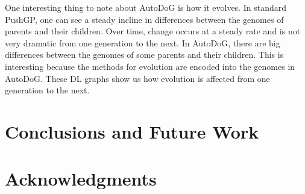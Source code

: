 \documentclass{sig-alternate}
\begin{document}
One interesting thing to note about AutoDoG is how it evolves. In standard PushGP, one can see a steady incline in differences between the genomes of parents and their children. Over time, change occurs at a steady rate and is not very dramatic from one generation to the next. In AutoDoG, there are big differences between the genomes of some parents and their children. This is interesting because the methods for evolution are encoded into the genomes in AutoDoG. These DL graphs  show us how evolution is affected from one generation to the next.
\section{Conclusions and Future Work}
\label{sec:conclusion}

\section{Acknowledgments}
\label{sec:acknowledgments}



  

\end{document}
